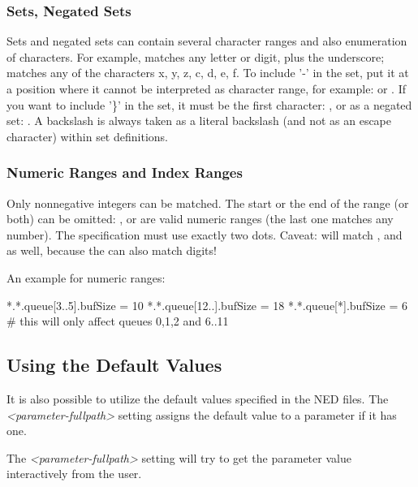 \subsubsection{Sets, Negated Sets}
\label{sec:config-sim:sets-negated-sets}

Sets and negated sets can contain several character ranges and also
enumeration of characters. For example,  matches any letter
or digit, plus the underscore;  matches any of the characters
x, y, z, c, d, e, f.
To include '-' in the set, put it at a position where it cannot be
interpreted as character range, for example:  or .
If you want to include '\}' in the set, it must be the first
character: , or as a negated set: .
A backslash is always taken as a literal backslash (and not as an escape character)
within set definitions.


\subsubsection{Numeric Ranges and Index Ranges}
\label{sec:config-sim:numeric-ranges-and-index-ranges}

Only nonnegative integers can be matched.  The start or the end of the range
(or both) can be omitted: ,  or 
are valid numeric ranges (the last one matches any number).
The specification must use exactly two dots.
Caveat:  will match ,  and  as well,
because the \ttt{*} can also match digits!

An example for numeric ranges:

\begin{inifile}
[General]
*.*.queue[3..5].bufSize = 10
*.*.queue[12..].bufSize = 18
*.*.queue[*].bufSize = 6  # this will only affect queues 0,1,2 and 6..11
\end{inifile}


\subsection{Using the Default Values}
\label{sec:config-sim:using-default-values}

It is also possible to utilize the default values specified in the NED files.
The \textit{<parameter-fullpath>} setting assigns
the default value to a parameter if it has one.

The \textit{<parameter-fullpath>} setting will try to get the parameter
value interactively from the user.


